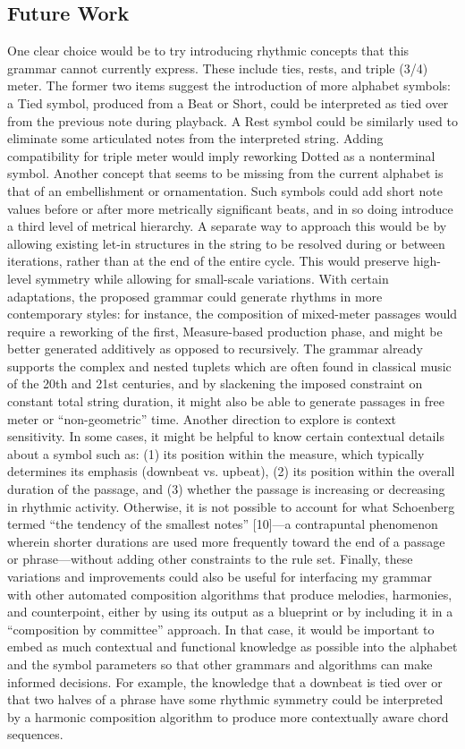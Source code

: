 \documentclass{article}
\begin{document}
\subsection{Future Work}
	One clear choice would be to try introducing rhythmic concepts that this grammar cannot currently express. These include ties, rests, and triple (3/4) meter. The former two items suggest the introduction of more alphabet symbols: a Tied symbol, produced from a Beat or Short, could be interpreted as tied over from the previous note during playback. A Rest symbol could be similarly used to eliminate some articulated notes from the interpreted string. Adding compatibility for triple meter would imply reworking Dotted as a nonterminal symbol.
	Another concept that seems to be missing from the current alphabet is that of an embellishment or ornamentation. Such symbols could add short note values before or after more metrically significant beats, and in so doing introduce a third level of metrical hierarchy. A separate way to approach this would be by allowing existing let-in structures in the string to be resolved during or between iterations, rather than at the end of the entire cycle. This would preserve high-level symmetry while allowing for small-scale variations.
	With certain adaptations, the proposed grammar could generate rhythms in more contemporary styles: for instance, the composition of mixed-meter passages would require a reworking of the first, Measure-based production phase, and might be better generated additively as opposed to recursively. The grammar already supports the complex and nested tuplets which are often found in classical music of the 20th and 21st centuries, and by slackening the imposed constraint on constant total string duration, it might also be able to generate passages in free meter or “non-geometric” time.
Another direction to explore is context sensitivity. In some cases, it might be helpful to know certain contextual details about a symbol such as: (1) its position within the measure, which typically determines its emphasis (downbeat vs. upbeat), (2) its position within the overall duration of the passage, and (3) whether the passage is increasing or decreasing in rhythmic activity. Otherwise, it is not possible to account for what Schoenberg termed “the tendency of the smallest notes” [10]—a contrapuntal phenomenon wherein shorter durations are used more frequently toward the end of a passage or phrase—without adding other constraints to the rule set.
Finally, these variations and improvements could also be useful for interfacing my grammar with other automated composition algorithms that produce melodies, harmonies, and counterpoint, either by using its output as a blueprint or by including it in a “composition by committee” approach. In that case, it would be important to embed as much contextual and functional knowledge as possible into the alphabet and the symbol parameters so that other grammars and algorithms can make informed decisions. For example, the knowledge that a downbeat is tied over or that two halves of a phrase have some rhythmic symmetry could be interpreted by a harmonic composition algorithm to produce more contextually aware chord sequences.



\end{document}
